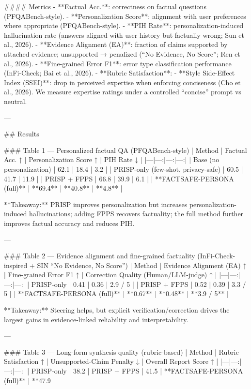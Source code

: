 #### Metrics  
- **Factual Acc.**: correctness on factual questions (PFQABench-style).  
- **Personalization Score**: alignment with user preferences where appropriate (PFQABench-style).  
- **PIH Rate**: personalization-induced hallucination rate (answers aligned with user history but factually wrong; Sun et al., 2026).  
- **Evidence Alignment (EA)**: fraction of claims supported by attached evidence; unsupported → penalized (“No Evidence, No Score”; Ren et al., 2026).  
- **Fine-grained Error F1**: error type classification performance (InFi-Check; Bai et al., 2026).  
- **Rubric Satisfaction**: %
- **Style Side-Effect Index (SSEI)**: drop in perceived expertise when enforcing conciseness (Cho et al., 2026). We measure expertise ratings under a controlled “concise” prompt vs neutral.

---

## Results  

### Table 1 — Personalized factual QA (PFQABench-style)  
| Method | Factual Acc. ↑ | Personalization Score ↑ | PIH Rate ↓ |
|---|---:|---:|---:|
| Base (no personalization) | 62.1 | 18.4 | 3.2 |
| PRISP-only (few-shot, privacy-safe) | 60.5 | 41.7 | 11.9 |
| PRISP + FPPS | 66.8 | 39.9 | 6.1 |
| **FACTSAFE-PERSONA (full)** | **69.4** | **40.8** | **4.8** |

**Takeaway:** PRISP improves personalization but increases personalization-induced hallucinations; adding FPPS recovers factuality; the full method further improves factual accuracy and reduces PIH.

---

### Table 2 — Evidence alignment and fine-grained factuality (InFi-Check-inspired + SIN “No Evidence, No Score”)  
| Method | Evidence Alignment (EA) ↑ | Fine-grained Error F1 ↑ | Correction Quality (Human/LLM-judge) ↑ |
|---|---:|---:|---:|
| PRISP-only | 0.41 | 0.36 | 2.9 / 5 |
| PRISP + FPPS | 0.52 | 0.39 | 3.3 / 5 |
| **FACTSAFE-PERSONA (full)** | **0.67** | **0.48** | **3.9 / 5** |

**Takeaway:** Steering helps, but explicit verification/correction drives the largest gains in evidence-linked reliability and interpretability.

---

### Table 3 — Long-form synthesis quality (rubric-based)  
| Method | Rubric Satisfaction ↑ | Unsupported-Claim Penalty ↓ | Overall Report Score ↑ |
|---|---:|---:|---:|
| PRISP-only | 38.2%
| PRISP + FPPS | 41.5%
| **FACTSAFE-PERSONA (full)** | **47.9%

